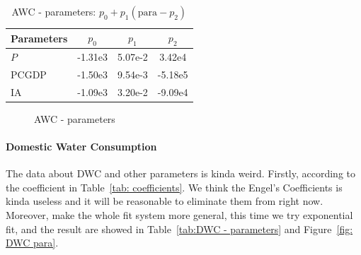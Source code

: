   \begin{table}[!h]
  \centering
  \begin{tabular}{l||c|c|c}
  \hline
  Parameters & $p_0$  &  $p_1$  & $p_2$ \\ \hline
  $P$       &  -1.31e3 & 5.07e-2 & 3.42e4 \\ \hline
  $\text{PCGDP}$ & -1.50e3 &  9.54e-3 & -5.18e5 \\ \hline
  $\text{IA}$   & -1.09e3  &  3.20e-2 & -9.09e4 \\ \hline
  \end{tabular}
  \caption{AWC - parameters: $p_0 +p_1 (\text{para}-p_2)$ }
  \label{tab:AWC - parameters}
  \end{table}

  \begin{figure}[!h]
  \centering
  \caption{AWC - parameters}
  \label{fig: AWC para}
  \end{figure}

  \paragraph{Domestic Water Consumption}
  The data about DWC and other parameters is kinda weird. Firstly, according to the coefficient in Table~\ref{tab: coefficients}. We think the Engel's Coefficients is kinda useless and it will be reasonable to eliminate them from right now. Moreover, make the whole fit system more general, this time we try exponential fit, and the result are showed in Table~\ref{tab:DWC - parameters} and Figure~\ref{fig: DWC para}.

